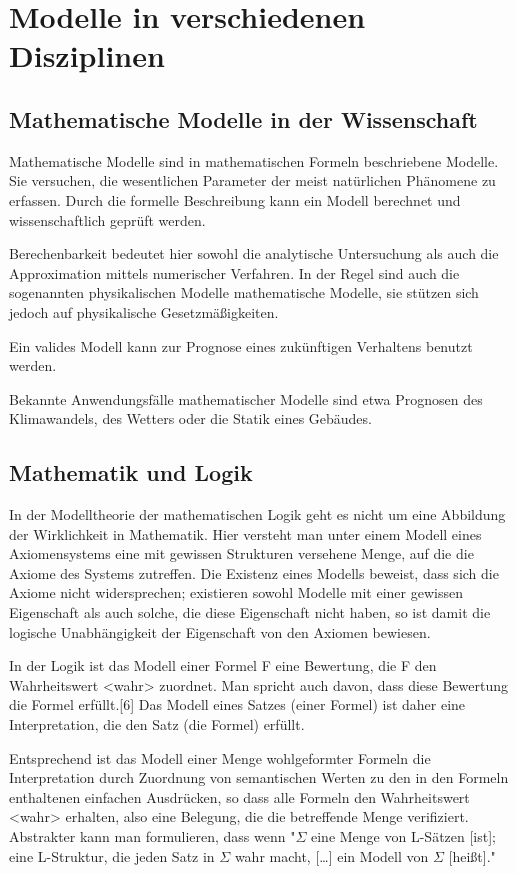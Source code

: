 \documentclass[a4paper, 12pt]{scrartcl}
\begin{document}
\section{Modelle in verschiedenen Disziplinen}
\subsection{Mathematische Modelle in der Wissenschaft}
Mathematische Modelle sind in mathematischen Formeln beschriebene Modelle. Sie versuchen, die wesentlichen Parameter der meist natürlichen Phänomene zu erfassen. Durch die formelle Beschreibung kann ein Modell berechnet und wissenschaftlich geprüft werden.

Berechenbarkeit bedeutet hier sowohl die analytische Untersuchung als auch die Approximation mittels numerischer Verfahren. In der Regel sind auch die sogenannten physikalischen Modelle mathematische Modelle, sie stützen sich jedoch auf physikalische Gesetzmäßigkeiten.

Ein valides Modell kann zur Prognose eines zukünftigen Verhaltens benutzt werden.

Bekannte Anwendungsfälle mathematischer Modelle sind etwa Prognosen des Klimawandels, des Wetters oder die Statik eines Gebäudes.

\subsection{Mathematik und Logik}
In der Modelltheorie der mathematischen Logik geht es nicht um eine Abbildung der Wirklichkeit in Mathematik. Hier versteht man unter einem Modell eines Axiomensystems eine mit gewissen Strukturen versehene Menge, auf die die Axiome des Systems zutreffen. Die Existenz eines Modells beweist, dass sich die Axiome nicht widersprechen; existieren sowohl Modelle mit einer gewissen Eigenschaft als auch solche, die diese Eigenschaft nicht haben, so ist damit die logische Unabhängigkeit der Eigenschaft von den Axiomen bewiesen.

In der Logik ist das Modell einer Formel F eine Bewertung, die F den Wahrheitswert <wahr> zuordnet. Man spricht auch davon, dass diese Bewertung die Formel erfüllt.[6] Das Modell eines Satzes (einer Formel) ist daher eine Interpretation, die den Satz (die Formel) erfüllt.

Entsprechend ist das Modell einer Menge wohlgeformter Formeln die Interpretation durch Zuordnung von semantischen Werten zu den in den Formeln enthaltenen einfachen Ausdrücken, so dass alle Formeln den Wahrheitswert <wahr> erhalten, also eine Belegung, die die betreffende Menge verifiziert. Abstrakter kann man formulieren, dass wenn "$\Sigma$ eine Menge von L-Sätzen [ist]; eine L-Struktur, die jeden Satz in $\Sigma$ wahr macht, [\dots] ein Modell von $\Sigma$ [heißt]."
\end{document}
